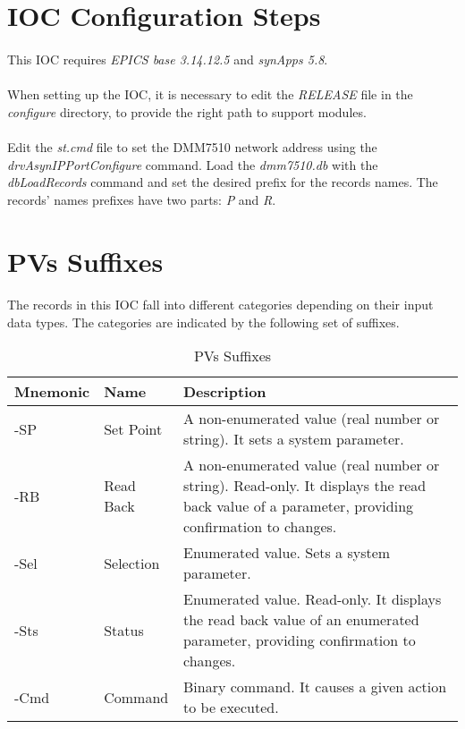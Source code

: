 \documentclass[openany]{article}
\begin{document}
\section{IOC Configuration Steps}

	\paragraph{} This IOC requires \emph{EPICS base 3.14.12.5} and \emph{synApps 5.8}.

	\paragraph{} When setting up the IOC, it is necessary to edit the \emph{RELEASE} file in the \emph{configure} directory, to provide the right path to support modules.

	\paragraph{} Edit the \emph{st.cmd} file to set the DMM7510 network address using the \emph{drvAsynIPPortConfigure} command. Load the \emph{dmm7510.db} with the \emph{dbLoadRecords} command and set the desired prefix for the records names. The records' names prefixes have two parts: \emph{P} and \emph{R}.

\section{PVs Suffixes}

	\paragraph{} The records in this IOC fall into different categories depending on their input data types. The categories are indicated by the following set of suffixes.

	\begin{table}[!h]
		\center
		\caption{PVs Suffixes}
		\begin{tabular}{m{3cm} m{3cm} m{7cm}}
			\hline
			\bfseries Mnemonic & \bfseries Name & \bfseries Description \\ \hline
			-SP & Set Point & A non-enumerated value (real number or string). It sets a system parameter. \\ \hline
			-RB & Read Back & A non-enumerated value (real number or string). Read-only. It displays the read back value of a parameter, providing confirmation to changes. \\ \hline
			-Sel & Selection & Enumerated value. Sets a system parameter. \\ \hline
			-Sts & Status & Enumerated value. Read-only. It displays the read back value of an enumerated parameter, providing confirmation to changes. \\ \hline
			-Cmd & Command & Binary command. It causes a given action to be executed. \\ \hline
		\end{tabular}
	\end{table}
\end{document}

